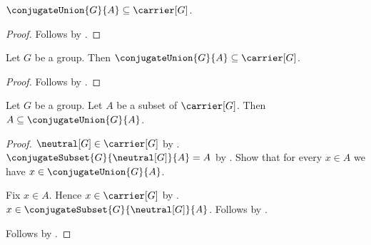 \begin{proposition}\label{conjugate_union_subseteq_carrier}
    $\conjugateUnion{G}{A}\subseteq\carrier[G]$.
\end{proposition}
\begin{proof}
    Follows by .
\end{proof}

\begin{classification}\label{conjugate_union_is_subset_in_group}
    Let $G$ be a group.
    Then $\conjugateUnion{G}{A}\subseteq\carrier[G]$.
\end{classification}
\begin{proof}
    Follows by .
\end{proof}

\begin{proposition}\label{conjugate_union_contains_generators}
    Let $G$ be a group.
    Let $A$ be a subset of $\carrier[G]$.
    Then $A\subseteq\conjugateUnion{G}{A}$.
\end{proposition}
\begin{proof}
    $\neutral[G]\in\carrier[G]$ by
        .
    $\conjugateSubset{G}{\neutral[G]}{A}=A$ by
        .
    Show that for every $x\in A$ we have
        $x\in\conjugateUnion{G}{A}$.
    \begin{subproof}
        Fix $x\in A$.
        Hence $x\in\carrier[G]$ by .
        $x\in\conjugateSubset{G}{\neutral[G]}{A}$.
        Follows by .
    \end{subproof}
    Follows by .
\end{proof}

